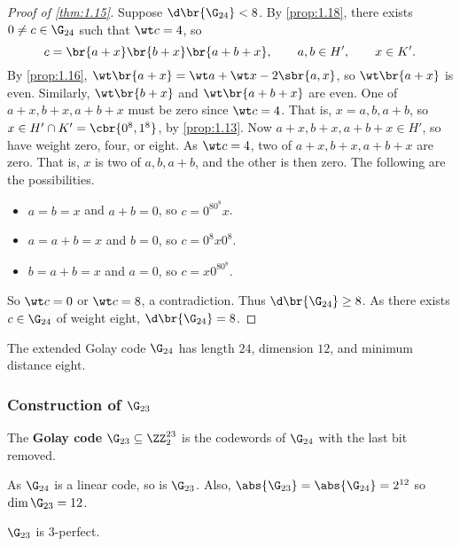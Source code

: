 \begin{proof}[Proof of \ref{thm:1.15}]
Suppose $ \d\br{\G_{24}} < 8 $. By \ref{prop:1.18}, there exists $ 0 \ne c \in \G_{24} $ such that $ \wt c = 4 $, so
$$ c = \br{a + x}\br{b + x}\br{a + b + x}, \qquad a, b \in H', \qquad x \in K'. $$
By \ref{prop:1.16}, $ \wt \br{a + x} = \wt a + \wt x - 2\sbr{a, x} $, so $ \wt \br{a + x} $ is even. Similarly, $ \wt \br{b + x} $ and $ \wt \br{a + b + x} $ are even. One of $ a + x, b + x, a + b + x $ must be zero since $ \wt c = 4 $. That is, $ x = a, b, a + b $, so $ x \in H' \cap K' = \cbr{0^8, 1^8} $, by \ref{prop:1.13}. Now $ a + x, b + x, a + b + x \in H' $, so have weight zero, four, or eight. As $ \wt c = 4 $, two of $ a + x, b + x, a + b + x $ are zero. That is, $ x $ is two of $ a, b, a + b $, and the other is then zero. The following are the possibilities.
\begin{itemize}
\item $ a = b = x $ and $ a + b = 0 $, so $ c = 0^80^8x $.
\item $ a = a + b = x $ and $ b = 0 $, so $ c = 0^8x0^8 $.
\item $ b = a + b = x $ and $ a = 0 $, so $ c = x0^80^8 $.
\end{itemize}
So $ \wt c = 0 $ or $ \wt c = 8 $, a contradiction. Thus $ \d\br{\G_{24}} \ge 8 $. As there exists $ c \in \G_{24} $ of weight eight, $ \d\br{\G_{24}} = 8 $.
\end{proof}

\begin{theorem}
The extended Golay code $ \G_{24} $ has length $ 24 $, dimension $ 12 $, and minimum distance eight.
\end{theorem}

\subsubsection{Construction of \texorpdfstring{$ \G_{23} $}{G23}}

\begin{definition*}
The \textbf{Golay code} $ \G_{23} \subseteq \ZZ_2^{23} $ is the codewords of $ \G_{24} $ with the last bit removed.
\end{definition*}

As $ \G_{24} $ is a linear code, so is $ \G_{23} $. Also, $ \abs{\G_{23}} = \abs{\G_{24}} = 2^{12} $ so $ \dim \G_{23} = 12 $.

\begin{theorem}
$ \G_{23} $ is $ 3 $-perfect.
\end{theorem}

